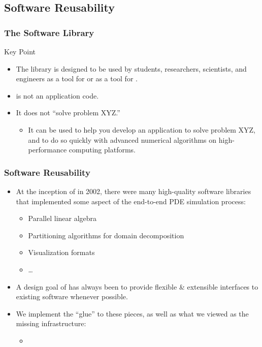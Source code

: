  

\subsection{Software Reusability}
\frame
{
  \frametitle{The \libmesh{} Software Library}

  \begin{block}{Key Point}
    \begin{itemize}
      \item The \libmesh{} library is designed to be used by students, researchers, scientists, and engineers as a tool for  or as a tool for .
      \item \libMesh{} is not an application code.
      \item It does not ``solve problem XYZ.''
        \begin{itemize}
          \item It can be used to help you develop an application to solve problem XYZ, and to do so quickly with advanced numerical algorithms on high-performance computing platforms.
        \end{itemize}
    \end{itemize}    
  \end{block}
} 



\frame
{
  \frametitle{Software Reusability}
  \begin{itemize}
    \item At the inception of \libMesh{} in 2002, there were many high-quality software libraries that implemented some aspect of the end-to-end PDE simulation process:
      \begin{itemize}
        \item Parallel linear algebra
        \item Partitioning algorithms for domain decomposition
        \item Visualization formats
        \item \ldots
      \end{itemize}
    \item A design goal of \libMesh{} has always been to provide flexible \& extensible interfaces to existing software whenever possible.
    \item We implement the ``glue'' to these pieces, as well as what we viewed as the missing infrastructure:
      \begin{itemize}
        \item {}
      \end{itemize}          
  \end{itemize}  
}



